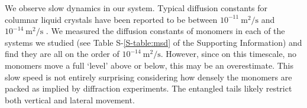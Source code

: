 \documentclass[journal=jpcbfk,manuscript=article]{achemso}
\begin{document}
  We observe slow dynamics in our system. Typical diffusion constants for columnar
  liquid crystals have been reported to be between $10^{-11}~ \mathrm{m}^2/\mathrm{s}$ 
  \cite{dong_translational_1984} and $10^{-14}~\mathrm{m}^2/\mathrm{s}$ \cite{dvinskikh_molecular_2002}. 
  We measured the diffusion constants of monomers in each of the systems we
  studied (see Table S-\ref{S-table:msd} of the Supporting Information) and find they are all on the order of
  $10^{-14}~\mathrm{m}^2/\mathrm{s}$. However, since on this timescale, no monomers move
  a full `level' above or below, this may be an overestimate. This slow speed is
  not entirely surprising considering how densely the monomers are
  packed as implied by diffraction experiments. The entangled tails
  likely restrict both vertical and lateral movement.
  

\end{document}
